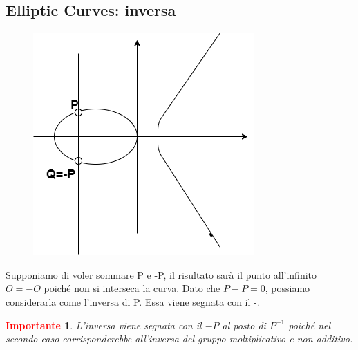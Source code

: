 \documentclass{book}
\newtheorem*{Importante}{\textbf{\textcolor{red}{Importante}}}
\begin{document}
\subsection{Elliptic Curves: inversa}
\begin{figure}
	\centering
	\includegraphics[scale=0.35]{ECaddition4.png}%
\end{figure}
Supponiamo di voler sommare P e -P, il risultato sarà il punto all'infinito \(O=-O\) poiché non si interseca la curva. Dato che \(P-P=0\), possiamo considerarla come l'inversa di P\@.\newline
Essa viene segnata con il -.
\begin{Importante}
	L'inversa viene segnata con il \(-P\) al posto di \(P^{-1}\) poiché nel secondo caso corrisponderebbe all'inversa del gruppo moltiplicativo e non additivo.
\end{Importante}
\end{document}
